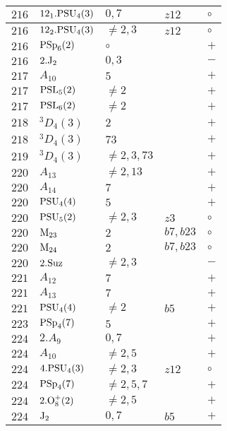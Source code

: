 \documentclass[a4paper, 11pt]{article}
\begin{document}
\begin{longtable}{lllll}
		$216$ & $12_1.{\rm PSU}_{4}(3)$ & $0,7$ & $z12$ & $\circ$ \\ \hline
		$216$ & $12_2.{\rm PSU}_{4}(3)$ & $\neq 2,3$ & $z12$ & $\circ$ \\ \hline
		$216$ & ${\rm PSp}_{6}(2)$ & $\circ$ &  & $+$ \\ \hline
		$216$ & $2.{\rm J}_2$ & $0,3$ &  & $-$ \\ \hline
		$217$ & $A_{10}$ & $5$ &  & $+$ \\ \hline
		$217$ & ${\rm PSL}_{5}(2)$ & $\neq 2$ &  & $+$ \\ \hline
		$217$ & ${\rm PSL}_{6}(2)$ & $\neq 2$ &  & $+$ \\ \hline
		$218$ & ${}^{3}D_{4}(3)$ & $2$ &  & $+$ \\ \hline
		$218$ & ${}^{3}D_{4}(3)$ & $73$ &  & $+$ \\ \hline
		$219$ & ${}^{3}D_{4}(3)$ & $\neq 2,3,73$ &  & $+$ \\ \hline
		$220$ & $A_{13}$ & $\neq 2,13$ &  & $+$ \\ \hline
		$220$ & $A_{14}$ & $7$ &  & $+$ \\ \hline
		$220$ & ${\rm PSU}_{4}(4)$ & $5$ &  & $+$ \\ \hline
		$220$ & ${\rm PSU}_{5}(2)$ & $\neq 2,3$ & $z3$ & $\circ$ \\ \hline
		$220$ & ${\rm M}_{23}$ & $2$ & $b7, b23$ & $\circ$ \\ \hline
		$220$ & ${\rm M}_{24}$ & $2$ & $b7, b23$ & $\circ$ \\ \hline
		$220$ & $2.{\rm Suz}$ & $\neq 2,3$ &  & $-$ \\ \hline
		$221$ & $A_{12}$ & $7$ &  & $+$ \\ \hline
		$221$ & $A_{13}$ & $7$ &  & $+$ \\ \hline
		$221$ & ${\rm PSU}_{4}(4)$ & $\neq 2$ & $b5$ & $+$ \\ \hline
		$223$ & ${\rm PSp}_{4}(7)$ & $5$ &  & $+$ \\ \hline
		$224$ & $2.A_{9}$ & $0,7$ &  & $+$ \\ \hline
		$224$ & $A_{10}$ & $\neq 2,5$ &  & $+$ \\ \hline
		$224$ & $4.{\rm PSU}_{4}(3)$ & $\neq 2,3$ & $z12$ & $\circ$ \\ \hline
		$224$ & ${\rm PSp}_{4}(7)$ & $\neq 2,5,7$ &  & $+$ \\ \hline
		$224$ & $2.{\rm O}_{8}^+(2)$ & $\neq 2,5$ &  & $+$ \\ \hline
		$224$ & ${\rm J}_2$ & $0,7$ & $b5$ & $+$ \\ \hline

\end{longtable}
\end{document}

